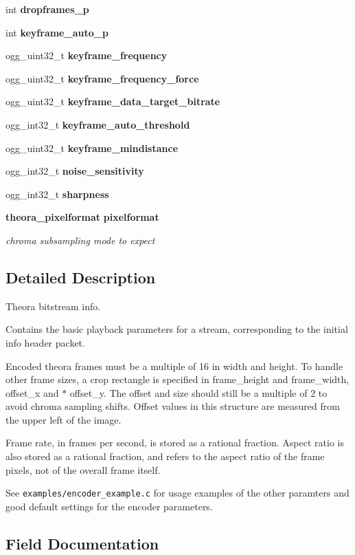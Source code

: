 \begin{DoxyCompactItemize}
int {\bf dropframes\+\_\+p}
\item 
int {\bf keyframe\+\_\+auto\+\_\+p}
\item 
ogg\+\_\+uint32\+\_\+t {\bf keyframe\+\_\+frequency}
\item 
ogg\+\_\+uint32\+\_\+t {\bf keyframe\+\_\+frequency\+\_\+force}
\item 
ogg\+\_\+uint32\+\_\+t {\bf keyframe\+\_\+data\+\_\+target\+\_\+bitrate}
\item 
ogg\+\_\+int32\+\_\+t {\bf keyframe\+\_\+auto\+\_\+threshold}
\item 
ogg\+\_\+uint32\+\_\+t {\bf keyframe\+\_\+mindistance}
\item 
ogg\+\_\+int32\+\_\+t {\bf noise\+\_\+sensitivity}
\item 
ogg\+\_\+int32\+\_\+t {\bf sharpness}
\item 
{\bf theora\+\_\+pixelformat} {\bf pixelformat}
\begin{DoxyCompactList}\small\item\em chroma subsampling mode to expect \end{DoxyCompactList}\end{DoxyCompactItemize}


\subsection{Detailed Description}
Theora bitstream info. 

Contains the basic playback parameters for a stream, corresponding to the initial \textquotesingle{}info\textquotesingle{} header packet.

Encoded theora frames must be a multiple of 16 in width and height. To handle other frame sizes, a crop rectangle is specified in frame\+\_\+height and frame\+\_\+width, offset\+\_\+x and $\ast$ offset\+\_\+y. The offset and size should still be a multiple of 2 to avoid chroma sampling shifts. Offset values in this structure are measured from the upper left of the image.

Frame rate, in frames per second, is stored as a rational fraction. Aspect ratio is also stored as a rational fraction, and refers to the aspect ratio of the frame pixels, not of the overall frame itself.

See {\tt examples/encoder\+\_\+example.\+c} for usage examples of the other paramters and good default settings for the encoder parameters. 

\subsection{Field Documentation}
